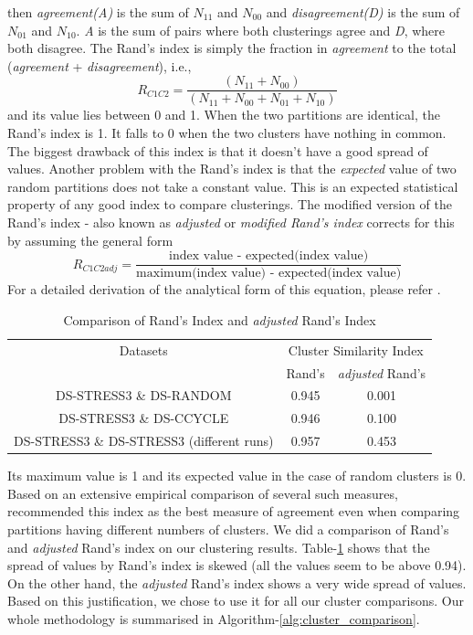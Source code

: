 then \textit{agreement(A)} is the sum of $N_{11}$ and $N_{00}$ and \textit{disagreement(D)} is the sum of $N_{01}$ and $N_{10}$. \textit{A} is the sum of pairs where both clusterings agree and \textit{D}, where both disagree. The Rand's index is simply the fraction in \textit{agreement} to the total (\textit{agreement} + \textit{disagreement}), i.e.,
\[
R_{C1C2}=\frac{(N_{11} + N_{00})}{(N_{11} + N_{00}+N_{01} + N_{10})}
\]
and its value lies between 0 and 1. When the two partitions are identical, the Rand's index is 1. It falls to 0 when the two clusters have nothing in common. The biggest drawback of this index is that it doesn't have a good spread of values. Another problem with the Rand's index is that the \textit{expected} value of two random partitions does not take a constant value. This is an expected statistical property of any good index to compare clusterings. The modified version of the Rand's index - also known as \textit{adjusted} or \textit{modified Rand's index} corrects for this by assuming the general form
\[
R_{C1C2adj}=\frac{\text{index value - expected(index value)}}{\text{maximum(index value) - expected(index value)}}
\]
For a detailed derivation of the analytical form of this equation, please refer \citet{hubert85comparing}. 
\begin{table}[t]
\centering
\begin{tabular}{|c|c|c|}
\hline
Datasets & \multicolumn{2}{|c|}{Cluster Similarity Index} \\
& Rand's &  \textit{adjusted} Rand's \\
\hline
DS-STRESS3 \& DS-RANDOM & 0.945 & 0.001 \\
DS-STRESS3 \& DS-CCYCLE & 0.946 & 0.100 \\ 
DS-STRESS3 \& DS-STRESS3 (different runs) & 0.957 & 0.453 \\
\hline 
\end{tabular}
\caption{Comparison of Rand's Index and \textit{adjusted} Rand's Index}
\label{tab:rand_vs_adjustedrands}
\end{table}

Its maximum value is 1 and its expected value in the case of random clusters is 0. Based on an extensive empirical comparison of several such measures, \citet{milligan85exam} recommended this index as the best measure of agreement even when comparing partitions having different numbers of clusters. We did a comparison of Rand's and \textit{adjusted} Rand's index on our clustering results. Table-\ref{tab:rand_vs_adjustedrands} shows that the spread of values by Rand's index is skewed (all the values seem to be above 0.94). On the other hand, the \textit{adjusted} Rand's index shows a very wide spread of values. Based on this justification, we chose to use it for all our cluster comparisons. Our whole methodology is summarised in Algorithm-\ref{alg:cluster_comparison}.

